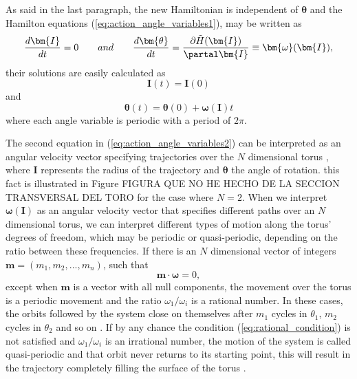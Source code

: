 As said in the last paragraph, the new Hamiltonian is independent of $\bm{\theta}$ and the Hamilton equations (\ref{eq:action_angle_variables1}), may be written as 
\begin{equation}
\frac{d\bm{I}}{dt}=0 \qquad and \qquad \frac{d\bm{\theta}}{dt}=\frac{\partial \tilde{H}(\bm{I})}{\partal \bm{I}}\equiv \bm{\omega}(\bm{I}),
\label{eq:action_angle_variables2}
\end{equation}
their solutions are easily calculated as
\begin{equation}
\bm{I}(t)=\bm{I}(0)
\end{equation}
and
\begin{equation}
\bm{\theta}(t)=\bm{\theta}(0)+\bm{\omega}(\bm{I})t
\end{equation}
where each angle variable is periodic with a period of $2\pi$.\par

The second equation in  (\ref{eq:action_angle_variables2}) can be interpreted as an angular velocity vector specifying trajectories over the $N$ dimensional torus \cite{goldstein2002classical}, where $\bm{I}$ represents the radius of the trajectory and $\bm{\theta}$ the angle of rotation. this fact is illustrated in Figure FIGURA QUE NO HE HECHO DE LA SECCION TRANSVERSAL DEL TORO for the case where $N=2$. When we interpret $\bm{\omega}(\bm{I})$ as an angular velocity vector that specifies different paths over an $N$ dimensional torus, we can interpret different types of motion along the torus' degrees of freedom, which may be periodic or quasi-periodic, depending on the ratio between these frequencies. If there is an $N$ dimensional vector of integers $\bm{m}=(m_1,m_2,...,m_n)$, such that
\begin{equation}
\bm{m}\cdot \bm{\omega}=0,
\label{eq:rational_condition}
\end{equation}
except when $\bm{m}$ is a vector with all null components, the movement over the torus is a periodic movement and the ratio $\omega_1/\omega_i$ is a rational number. In these cases, the orbits followed by the system close on themselves after $m_1$ cycles in $\theta_1$, $m_2$ cycles in $\theta_2$ and so on \cite{ott_chaos_2002}. If by any chance the condition (\ref{eq:rational_condition}) is not satisfied and $\omega_1/\omega_i$ is an irrational number, the motion of the system is called quasi-periodic and that orbit never returns to its starting point, this will result in the trajectory completely filling the surface of the torus \cite{ott_chaos_2002}.\par

